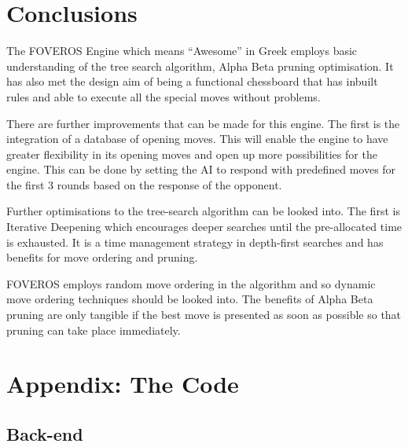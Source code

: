 \documentclass[11pt,a4paper]{article}
\begin{document}
\newpage
\section{Conclusions}

\indent\indent The FOVEROS Engine which means “Awesome” in Greek employs basic understanding of the tree search algorithm, Alpha Beta pruning optimisation. It has also met the design aim of being a functional chessboard that has inbuilt rules and able to execute all the special moves without problems.

	There are further improvements that can be made for this engine. The first is the integration of a database of opening moves. This will enable the engine to have greater flexibility in its opening moves and open up more possibilities for the engine. This can be done by setting the AI to respond with predefined moves for the first 3 rounds based on the response of the opponent.

	Further optimisations to the tree-search algorithm can be looked into. The first is Iterative Deepening which encourages deeper searches until the pre-allocated time is exhausted. It is a time management strategy in depth-first searches and has benefits for move ordering and pruning.\cite{chess9}

	FOVEROS employs random move ordering in the algorithm and so dynamic move ordering techniques should be looked into. The benefits of Alpha Beta pruning are only tangible if the best move is presented as soon as possible so that pruning can take place immediately.\cite{chess8}
 


\newpage


\newpage

\appendix
\section{Appendix: The Code}
\subsection{Back-end}
\end{document}
